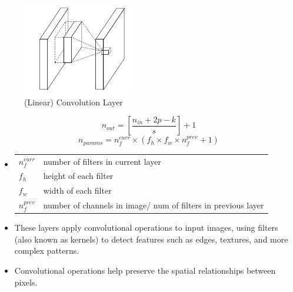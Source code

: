 \begin{table}[h]
    \begin{minipage}{0.44\linewidth}
        \begin{figure}[H]
            \centering
            \includegraphics[width=\linewidth, height=4cm, keepaspectratio]{Pictures/layers/conv-layer-linear.jpg}
            \caption{(Linear) Convolution Layer \cite{medium/towardsdatascience.com/review-nin-network-in-network-image-classification-69e271e499ee}}
        \end{figure}
    \end{minipage}
    \hfill
    \begin{minipage}{0.54\linewidth}
        \[
           \displaystyle n_{out} = \left[ \frac{n_{in} + 2p - k}{s} \right] + 1
        \]
        \[
            n_{params} = n_f^{curr} \times ( f_h \times f_w \times  n_f^{prev} + 1)
        \]
        
        \begin{itemize}
            \item[] 
            \begin{table}[H]
                \begin{tabular}{l p{5.5cm}}
                    $n_f^{curr}$ & number of filters in current layer \\
                
                    $f_h$ & height of each filter \\
                    
                    $f_w$ & width of each filter\\
                    
                    $n_f^{prev}$ & number of channels in image/ num of filters in previous layer
                \end{tabular}
            \end{table}
            
            \item These layers apply convolutional operations to input images, using filters (also known as kernels) to detect features such as edges, textures, and more complex patterns. 
            
            \item Convolutional operations help preserve the spatial relationships between pixels.
        \end{itemize}
    \end{minipage}
\end{table}

